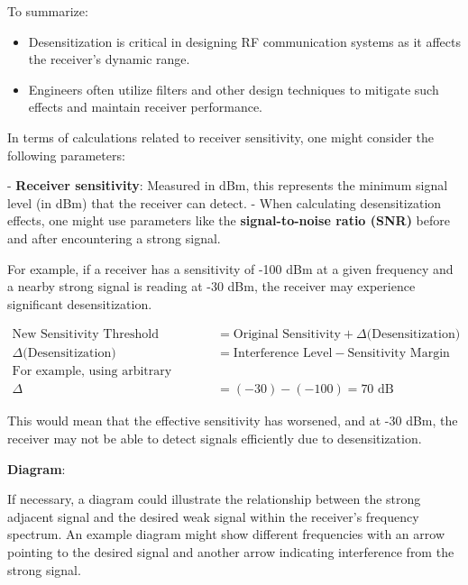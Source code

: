 To summarize:

\begin{itemize}
    \item Desensitization is critical in designing RF communication systems as it affects the receiver's dynamic range.
    \item Engineers often utilize filters and other design techniques to mitigate such effects and maintain receiver performance.
\end{itemize}

In terms of calculations related to receiver sensitivity, one might consider the following parameters:

- \textbf{Receiver sensitivity}: Measured in dBm, this represents the minimum signal level (in dBm) that the receiver can detect.
- When calculating desensitization effects, one might use parameters like the \textbf{signal-to-noise ratio (SNR)} before and after encountering a strong signal.

For example, if a receiver has a sensitivity of -100 dBm at a given frequency and a nearby strong signal is reading at -30 dBm, the receiver may experience significant desensitization. 

\begin{align*}
\text{New Sensitivity Threshold} &= \text{Original Sensitivity} + \Delta \text{(Desensitization)} \\
\Delta \text{(Desensitization)} &= \text{Interference Level} - \text{Sensitivity Margin} \\
\text{For example, using arbitrary values:} \\
\Delta &= (-30) - (-100) = 70 \text{ dB}
\end{align*}

This would mean that the effective sensitivity has worsened, and at -30 dBm, the receiver may not be able to detect signals efficiently due to desensitization.

\textbf{Diagram}: 

If necessary, a diagram could illustrate the relationship between the strong adjacent signal and the desired weak signal within the receiver's frequency spectrum. An example diagram might show different frequencies with an arrow pointing to the desired signal and another arrow indicating interference from the strong signal.
